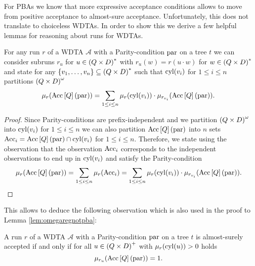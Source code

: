 For \acp{PBA} we know that more expressive acceptance conditions allows to
move from positive acceptance to almost-sure acceptance. Unfortunately, this 
does not translate to choiceless \acp{WDTA}. In order to show this we derive a
few helpful lemmas for reasoning about runs for \acp{WDTA}.
\begin{lemma}
  For any run $r$ of a \ac{WDTA} $\mathcal{A}$ with a Parity-condition 
  $\operatorname{par}$ on a tree $t$ we can consider subruns $r_{u}$ for 
  $u\in\left(Q\times D\right)^{*}$ with $r_{u}(w) = r(u\cdot w)$ for 
  $w\in\left(Q\times D\right)^{*}$ and state for any 
  $\left\{v_{1},\dots, v_{n}\right\}\subseteq\left(Q\times D\right)^{*}$ such that
  $\operatorname{cyl}(v_{i})$ for $1\leq i\leq n$ partitions $\left(Q\times D\right)^{\omega}$
  \begin{equation*}
    \mu_{r}(\operatorname{Acc}\left[Q\right](\operatorname{par})) = \sum\limits_{1\leq i\leq n}
      \mu_{r}(\operatorname{cyl}(v_{i}))\cdot\mu_{r_{v_{i}}}(\operatorname{Acc}\left[Q\right](\operatorname{par})).
  \end{equation*}
  \label{lem:subrunsum}
\end{lemma}
\begin{proof}
  Since Parity-conditions are prefix-independent and we partition 
  $\left(Q\times D\right)^{\omega}$ into $\operatorname{cyl}(v_{i})$ for $1\leq i\leq n$ we can 
  also partition $\operatorname{Acc}\left[Q\right](\operatorname{par})$ into $n$ sets 
  $\operatorname{Acc}_{i} = \operatorname{Acc}\left[Q\right](\operatorname{par})\cap\operatorname{cyl}(v_{i})$ for $1\leq i\leq n$.
  Therefore, we state using the observation that the observation $\operatorname{Acc}_{i}$
  corresponds to the independent observations to end up in $\operatorname{cyl}(v_{i})$ and
  satisfy the Parity-condition
  \begin{equation*}
    \mu_{r}(\operatorname{Acc}\left[Q\right](\operatorname{par})) = \sum\limits_{1\leq i\leq n}
      \mu_{r}(\operatorname{Acc}_{i}) = \sum\limits_{1\leq i\leq n}
      \mu_{r}(\operatorname{cyl}(v_{i}))\cdot\mu_{r_{v_{i}}}(\operatorname{Acc}\left[Q\right](\operatorname{par})).
  \end{equation*}
\end{proof}
This allows to deduce the following observation which is also used in the
proof to Lemma \ref{lem:omegaregnotpba}:
\begin{lemma}
  A run $r$ of a \ac{WDTA} $\mathcal{A}$ with a Parity-condition $\operatorname{par}$ on 
  a tree $t$ is almost-surely accepted if and only if for all 
  $u\in\left(Q\times D\right)^{+}$ with $\mu_{r}(\operatorname{cyl}(u)) > 0$ holds
  \begin{equation*}
    \mu_{r_{u}}(\operatorname{Acc}\left[Q\right](\operatorname{par})) = 1.
  \end{equation*}
  \label{lem:subrun1}
\end{lemma}
